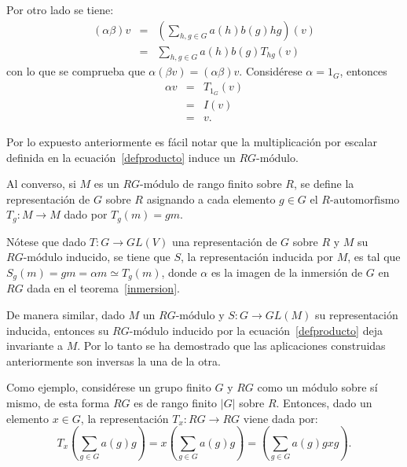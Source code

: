 \begin{proof*}
\begin{bulletList}
 Por otro lado se tiene:
 \begin{eqnarray*}
 (\alpha\beta)v &=& \left( \sum_{h,g \in G}a(h)b(g)hg  \right)(v)\\
  &=& \sum_{h,g \in G}a(h)b(g)T_{hg}(v)
 \end{eqnarray*}
 con lo que se comprueba que $\alpha(\beta v) = (\alpha\beta)v$.
 \newItem Considérese $\alpha = 1_{G}$, entonces
 \begin{eqnarray*}
 \alpha v &=& T_{1_G}(v)\\
  &=& I(v) \\
  &=& v.
 \end{eqnarray*}
 \end{bulletList}
  \hskip 1cm Por lo expuesto anteriormente es fácil notar que la multiplicación por escalar definida en la ecuación~\eqref{defproducto} induce un $RG\mbox{-módulo}$.
 
 Al converso, si $M$ es un $RG\mbox{-módulo}$ de rango finito sobre $R$, se define la representación de $G$ sobre $R$ asignando a cada elemento $g \in G$ el $R\mbox{-automorfismo}$ $T_g \colon M \to M$ dado por $T_g(m) = gm$.
 
 Nótese que dado $T \colon G \to GL(V)$ una representación de $G$ sobre $R$ y $M$ su $RG\mbox{-módulo}$ inducido, se tiene que $S$, la representación inducida por $M$, es tal que $S_g(m) = gm = \alpha m \simeq T_g(m)$, donde $\alpha$ es la imagen de la inmersión de $G$ en $RG$ dada en el teorema~\ref{inmersion}.
 
 De manera similar, dado $M$ un $RG\mbox{-módulo}$ y $S \colon G \to GL(M)$ su representación inducida, entonces su $RG\mbox{-módulo}$ inducido por la ecuación~\eqref{defproducto} deja invariante a $M$. Por lo tanto se ha demostrado que las aplicaciones construidas anteriormente son inversas la una de la otra. 
 \end{proof*}
  Como ejemplo, considérese  un grupo finito $G$ y $RG$ como un módulo sobre sí mismo, de esta forma $RG$ es de rango finito $|G|$ sobre $R$. Entonces, dado un elemento $x \in G$, la representación $T_x \colon RG \to RG$ viene dada por: \begin{equation*}T_{x}\left( \sum_{g \in G}a(g)g\right) = x\left( \sum_{g \in G}a(g)g\right) = \left( \sum_{g \in G}a(g)gxg\right).\end{equation*}
  
